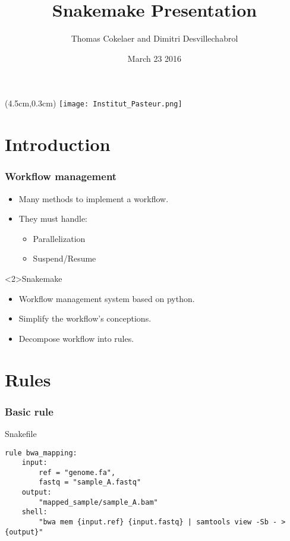 \documentclass{beamer}
\title{Snakemake Presentation}
\author[T.Cokelaer \& D.Desvillechabrol]{Thomas Cokelaer and Dimitri Desvillechabrol}
\institute{Institut Pasteur}
\date{March 23 2016}
\begin{document}

\begin{frame}[plain]
    \titlepage
    \begin{textblock*}{5cm}(4.5cm,0.3cm)
        \texttt{[image: Institut\_Pasteur.png]}
    \end{textblock*}
\end{frame}


\section{Introduction}

\begin{frame}
    \frametitle{Workflow management}
    \begin{itemize}
        \item Many methods to implement a workflow.
        \item They must handle:
            \begin{itemize}
                \item Parallelization
                \item Suspend/Resume
            \end{itemize}
    \end{itemize}
    \begin{block}<2>{Snakemake}
        \begin{itemize}
            \item Workflow management system based on python.
            \item Simplify the workflow's conceptions.
            \item Decompose workflow into rules.
        \end{itemize} 
    \end{block}
\end{frame}

\section{Rules}

\begin{frame}[fragile]
    \frametitle{Basic rule}
    \begin{block}{Snakefile}
    \begin{lstlisting}
rule bwa_mapping:
    input:
        ref = "genome.fa",
        fastq = "sample_A.fastq"
    output:
        "mapped_sample/sample_A.bam"
    shell:
        "bwa mem {input.ref} {input.fastq} | samtools view -Sb - > {output}"
    \end{lstlisting}
    \end{block}
\end{frame}
\end{document}
